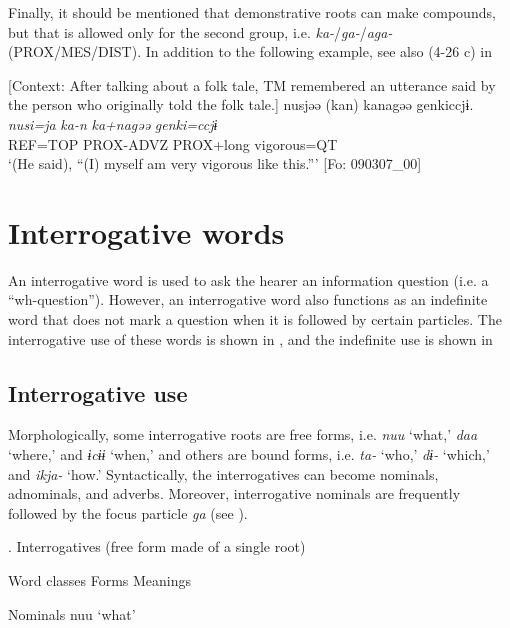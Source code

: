   Finally, it should be mentioned that demonstrative roots can make compounds, but that is allowed only for the second group, i.e. \textit{ka-}/\textit{ga-}/\textit{aga-} (PROX/MES/DIST). In addition to the following example, see also (4-26 c) in 

\ea \label{ex:5:30}   [Context: After talking about a folk tale, TM remembered an utterance said by the person who originally told the folk tale.]
\glll  nusjəə  (kan)  kanagəə  {\textbar}genki{\textbar}ccjɨ.\\
\textit{nusi=ja}  \textit{ka-n}  \textit{ka+nagəə}  \textit{genki=ccjɨ}\\
REF=TOP  PROX-ADVZ  PROX+long  vigorous=QT\\
\glt ‘(He said), “(I) myself am very vigorous like this.”’ [Fo: 090307\_00]
\z

\section{Interrogative words}
\label{bkm:Ref367267321}
An interrogative word is used to ask the hearer an information question (i.e. a “wh-question”). However, an interrogative word also functions as an indefinite word that does not mark a question when it is followed by certain particles. The interrogative use of these words is shown in , and the indefinite use is shown in 

\subsection{Interrogative use}

Morphologically, some interrogative roots are free forms, i.e. \textit{nuu} ‘what,’ \textit{daa} ‘where,’ and \textit{ɨcɨɨ} ‘when,’ and others are bound forms, i.e. \textit{ta-} ‘who,’ \textit{dɨ-} ‘which,’ and \textit{ikja-} ‘how.’ Syntactically, the interrogatives can become nominals, adnominals, and adverbs. Moreover, interrogative nominals are frequently followed by the focus particle \textit{ga} (see ).

\begin{styleBeschriftung}
\textmd{. Interrogatives (free form made of a single root)}
\end{styleBeschriftung}

Word classes    Forms  Meanings

Nominals    nuu  ‘what’

